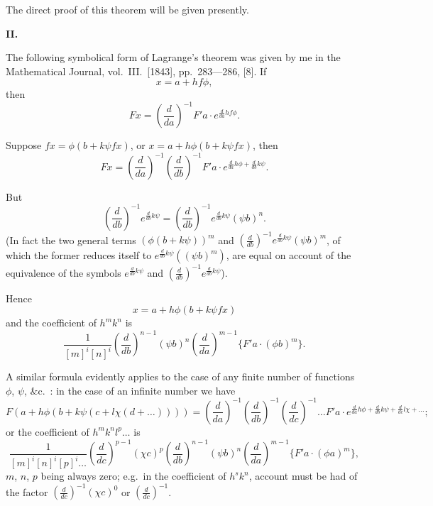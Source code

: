 \documentclass[11pt,a4paper]{book}
\begin{document}
The direct proof of this theorem will be given presently.

\bigskip
\noindent\textbf{II.}

The following symbolical form of Lagrange's theorem was given by me in the Mathematical Journal, vol.\ III.\ [1843], pp.\ 283---286, [8]. If
\begin{equation}
x = a + hf\phi,
\tag{7}
\end{equation}
then
\[ Fx = \left( \frac{d}{da} \right)^{-1} F'a \cdot e^{\frac{d}{da}hf\phi}. \]

Suppose $fx = \phi(b + k\psi fx)$, or $x = a + h\phi(b + k\psi fx)$, then
\[ Fx = \left( \frac{d}{da} \right)^{-1} \left( \frac{d}{db} \right)^{-1} F'a \cdot e^{\frac{d}{da}h\phi + \frac{d}{db}k\psi}. \]

But
\[ \left( \frac{d}{db} \right)^{-1} e^{\frac{d}{db}k\psi} = \left( \frac{d}{db} \right)^{-1} e^{\frac{d}{db}k\psi} (\psi b)^n. \]
(In fact the two general terms $(\phi(b+k\psi))^m$ and $\left( \frac{d}{db} \right)^{-1} e^{\frac{d}{db}k\psi} (\psi b)^m$, of which the former reduces itself to $e^{\frac{d}{db}k\psi}((\psi b)^m)$, are equal on account of the equivalence of the symbols $e^{\frac{d}{db}k\psi}$ and $\left( \frac{d}{db} \right)^{-1} e^{\frac{d}{db}k\psi}$).

Hence
\begin{equation}
x = a + h\phi(b + k\psi fx)
\tag{8}
\end{equation}
and the coefficient of $h^m k^n$ is
\[ \frac{1}{[m]^i [n]^i} \left( \frac{d}{db} \right)^{n-1} (\psi b)^n \left( \frac{d}{da} \right)^{m-1} \{ F'a \cdot (\phi b)^m \}. \]

A similar formula evidently applies to the case of any finite number of functions $\phi$, $\psi$, \&c.\ : in the case of an infinite number we have
\begin{equation}
F(a + h\phi(b + k\psi(c + l\chi(d + \ldots)))) = \left( \frac{d}{da} \right)^{-1} \left( \frac{d}{db} \right)^{-1} \left( \frac{d}{dc} \right)^{-1} \ldots F'a \cdot e^{\frac{d}{da}h\phi + \frac{d}{db}k\psi + \frac{d}{dc}l\chi + \ldots};
\tag{9}
\end{equation}
or the coefficient of $h^m k^n l^p \ldots$ is
\[ \frac{1}{[m]^i [n]^i [p]^i \ldots} \left( \frac{d}{dc} \right)^{p-1} (\chi c)^p \left( \frac{d}{db} \right)^{n-1} (\psi b)^n \left( \frac{d}{da} \right)^{m-1} \{ F'a \cdot (\phi a)^m \}, \]
$m$, $n$, $p$ being always zero; e.g.\ in the coefficient of $h^s k^n$, account must be had of the factor $\left( \frac{d}{dc} \right)^{-1} (\chi c)^0$ or $\left( \frac{d}{dc} \right)^{-1}$.
\end{document}
